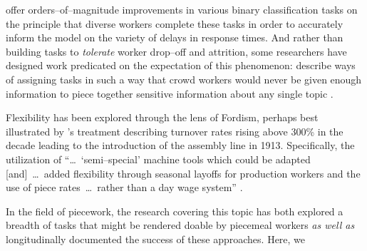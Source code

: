 \documentclass[trackingWork]{subfiles}
\begin{document}
\citeauthor{embracingErrorKrishna} offer orders--of--magnitude improvements
in various binary classification tasks
on the principle that diverse workers complete these tasks
in order to accurately inform the model on the variety of delays in response times.
And rather than building tasks to \textit{tolerate} worker drop--off and attrition,
some researchers have designed work predicated on the expectation of this phenomenon:
\citeauthor{sensitiveTasks} describe ways of assigning tasks in such a way that
crowd workers would never be given enough information to piece together sensitive information about
any single topic
\cite{sensitiveTasks}.

Flexibility has been explored through the lens of Fordism, perhaps best illustrated by
\citeauthor{tolliday1986between}'s treatment describing
turnover rates rising above 300\% in the decade leading to the introduction of the assembly line in 1913.
Specifically, the utilization of ``\dots~`semi--special' machine tools which could be adapted
[and]~\dots~added flexibility through seasonal layoffs for production workers and the use of
piece rates~\dots~rather than a day wage system''
\cite{tolliday1986between}.

In the field of piecework,
the research covering this topic has both explored
a breadth of tasks that might be rendered doable by piecemeal workers
\textit{as well as} longitudinally documented the success of these approaches.
Here, we 
\end{document}
